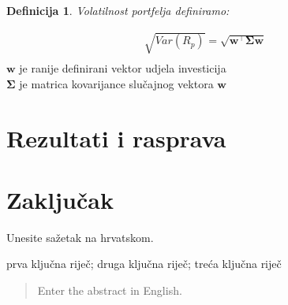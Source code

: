 \documentclass[zavrsnirad]{fer}
\newtheorem{definition}{Definicija}
\begin{document}
\begin{definition}
	Volatilnost portfelja definiramo:
\end{definition}
\begin{align*}
	\sqrt{Var(R_p)} = \sqrt{\mathbf{w^\intercal}\boldsymbol{\Sigma} \mathbf{w}} \\
\end{align*}
\indent \quad \quad $\mathbf{w}$ je ranije definirani vektor udjela investicija\\
\indent \quad \quad $\boldsymbol{\Sigma}$ je matrica kovarijance slučajnog vektora $\mathbf{w}$\\


\chapter{Rezultati i rasprava}
\label{pog:rezultati_i_rasprava}

\Blindtext

\chapter{Zaključak}
\label{pog:zakljucak}

\blindtext





\begin{sazetak}
	Unesite sažetak na hrvatskom.

	\blindtext
\end{sazetak}

\begin{kljucnerijeci}
	prva ključna riječ; druga ključna riječ; treća ključna riječ
\end{kljucnerijeci}

\begin{abstract}
	Enter the abstract in English.

	\blindtext
\end{abstract}
\end{document}
